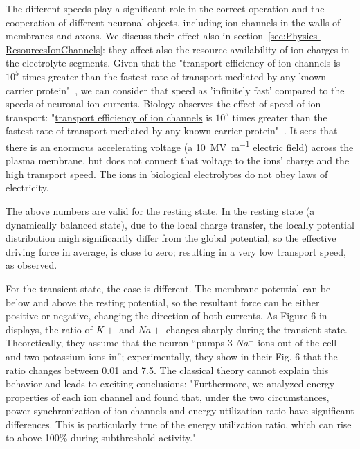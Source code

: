 The different speeds play a significant role in the correct operation and
the cooperation of different neuronal objects, including ion channels
in the walls of membranes and axons. We discuss 
their effect also in section~\ref{sec:Physics-ResourcesIonChannels}: they affect also the resource-availability of ion charges in the electrolyte segments.
Given that the "transport efficiency of ion channels
is  $10^5$ times greater than the fastest rate of transport mediated by any known carrier protein"~\cite{MolecularBiology:2002}, we can consider that speed as 'infinitely fast' compared to the speeds of neuronal ion currents.
Biology observes the effect of speed of ion transport:
"\href{https://www.ncbi.nlm.nih.gov/books/NBK26910}
{transport efficiency of ion channels}
is $10^5$ times greater than the fastest rate of transport mediated by any known carrier protein"~\cite{MolecularBiology:2002}.
It sees that there is an enormous accelerating voltage
(a \SI{10}{\mega\volt\per\meter} electric field)
across the plasma membrane, but does not connect that voltage
to the ions' charge and the high transport speed.
The ions in biological electrolytes do not obey laws of electricity.

The above numbers are valid for the resting state.
In the resting state (a dynamically balanced state), due to the local charge transfer, the locally potential distribution migh significantly differ from the global potential, so the effective driving force 
in average, is close to zero; resulting in a very low transport speed, as observed. 

For the transient state, the case is different. The membrane potential
can be below and above the resting potential, so the
resultant force can be either positive or negative,
changing the direction of both currents.
As Figure 6 in \cite{NeuralEnergyConsumption:2017} displays,
the ratio of $K+$ and $Na+$ changes sharply during the transient state.
Theoretically, they assume that the neuron “pumps 3 $Na^+$ ions out of the cell and two potassium ions in”; experimentally, they show in their Fig. 6 that the ratio changes between 0.01 and 7.5.
The classical theory cannot explain this behavior and leads
to exciting conclusions:
"Furthermore, we analyzed energy properties of each ion channel and found that, under the two circumstances, power synchronization of ion channels and energy utilization ratio have significant differences. This is particularly true of the energy utilization ratio, which can rise to above 100\% during subthreshold activity."~\cite{NeuralEnergyConsumption:2017}

